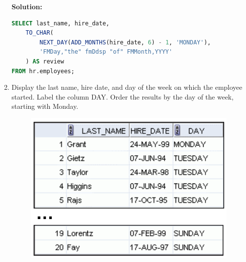 \documentclass[a4paper,12pt]{article}
\begin{document}
\begin{enumerate}
    \textbf{Solution: }
    \begin{lstlisting}[language=SQL]
SELECT last_name, hire_date,
    TO_CHAR(
        NEXT_DAY(ADD_MONTHS(hire_date, 6) - 1, 'MONDAY'),
        'FMDay,"the" fmDdsp "of" FMMonth,YYYY'
    ) AS review
FROM hr.employees;
    \end{lstlisting}
    \newpage
    \item Display the last name, hire date, and day of the week on which the employee started. Label the
column DAY. Order the results by the day of the week, starting with Monday.
    \begin{figure}[h]
        \centering
            \centering
            \includegraphics[width=.4\linewidth]{graphics/43.png}
    \end{figure}
    

\end{enumerate}
\end{document}
